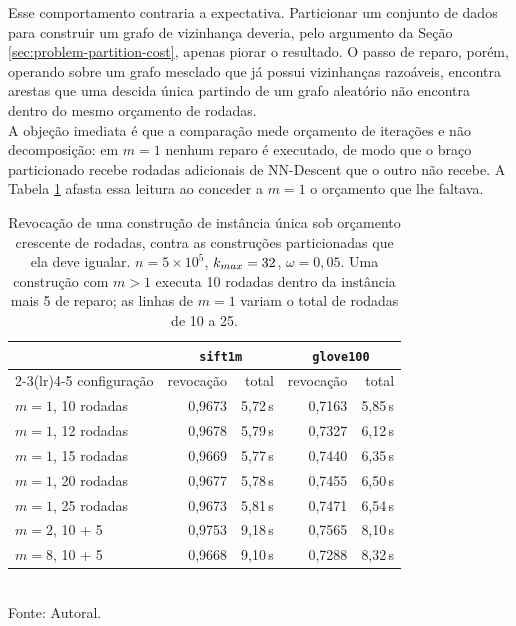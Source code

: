 Esse comportamento contraria a expectativa. Particionar um conjunto de dados para construir um grafo de vizinhança deveria, pelo argumento da Seção \ref{sec:problem-partition-cost}, apenas piorar o resultado. O passo de reparo, porém, operando sobre um grafo mesclado que já possui vizinhanças razoáveis, encontra arestas que uma descida única partindo de um grafo aleatório não encontra dentro do mesmo orçamento de rodadas.\\

A objeção imediata é que a comparação mede orçamento de iterações e não decomposição: em $m = 1$ nenhum reparo é executado, de modo que o braço particionado recebe rodadas adicionais de NN-Descent que o outro não recebe. A Tabela \ref{tab:budget} afasta essa leitura ao conceder a $m = 1$ o orçamento que lhe faltava.\\

\begin{table}[htb!]
\caption{\label{tab:budget} Revocação de uma construção de instância única sob orçamento crescente de rodadas, contra as construções particionadas que ela deve igualar. $n = 5 \times 10^5$, $k_{max} = 32$, $\omega = 0{,}05$. Uma construção com $m > 1$ executa 10 rodadas dentro da instância mais 5 de reparo; as linhas de $m = 1$ variam o total de rodadas de 10 a 25.}
\centering
\footnotesize
\begin{tabular}{@{}lrrrr@{}}
\toprule
 & \multicolumn{2}{c}{\texttt{sift1m}} & \multicolumn{2}{c}{\texttt{glove100}} \\
\cmidrule(lr){2-3}\cmidrule(lr){4-5}
configuração & revocação & total & revocação & total \\
\midrule
$m = 1$, 10 rodadas & 0,9673 & 5,72\,s & 0,7163 & 5,85\,s \\
$m = 1$, 12 rodadas & 0,9678 & 5,79\,s & 0,7327 & 6,12\,s \\
$m = 1$, 15 rodadas & 0,9669 & 5,77\,s & 0,7440 & 6,35\,s \\
$m = 1$, 20 rodadas & 0,9677 & 5,78\,s & 0,7455 & 6,50\,s \\
$m = 1$, 25 rodadas & 0,9673 & 5,81\,s & 0,7471 & 6,54\,s \\
\midrule
$m = 2$, 10 + 5       & 0,9753 & 9,18\,s & 0,7565 & 8,10\,s \\
$m = 8$, 10 + 5       & 0,9668 & 9,10\,s & 0,7288 & 8,32\,s \\
\bottomrule
\end{tabular}\\
Fonte: Autoral.
\end{table}

